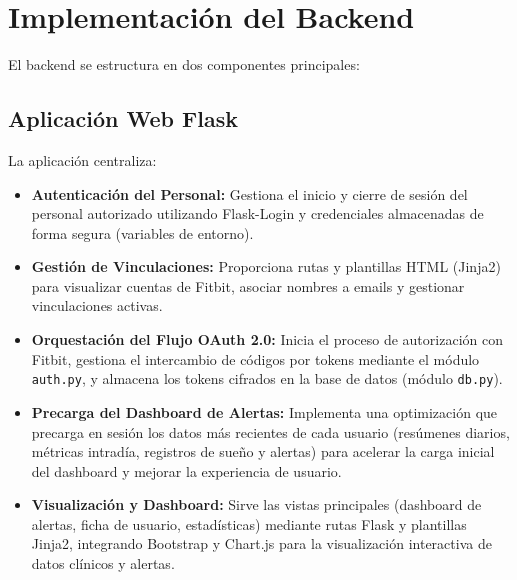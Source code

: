 \section{Implementación del Backend}
\label{sec:impl_backend}

El backend se estructura en dos componentes principales:

\subsection{Aplicación Web Flask}
La aplicación centraliza:
\begin{itemize}
    \item \textbf{Autenticación del Personal:} Gestiona el inicio y cierre de sesión del personal autorizado utilizando Flask-Login y credenciales almacenadas de forma segura (variables de entorno).
    \item \textbf{Gestión de Vinculaciones:} Proporciona rutas y plantillas HTML (Jinja2) para visualizar cuentas de Fitbit, asociar nombres a emails y gestionar vinculaciones activas.
    \item \textbf{Orquestación del Flujo OAuth 2.0:} Inicia el proceso de autorización con Fitbit, gestiona el intercambio de códigos por tokens mediante el módulo \texttt{auth.py}, y almacena los tokens cifrados en la base de datos (módulo \texttt{db.py}).
    \item \textbf{Precarga del Dashboard de Alertas:} Implementa una optimización que precarga en sesión los datos más recientes de cada usuario (resúmenes diarios, métricas intradía, registros de sueño y alertas) para acelerar la carga inicial del dashboard y mejorar la experiencia de usuario.
    \item \textbf{Visualización y Dashboard:} Sirve las vistas principales (dashboard de alertas, ficha de usuario, estadísticas) mediante rutas Flask y plantillas Jinja2, integrando Bootstrap y Chart.js para la visualización interactiva de datos clínicos y alertas.
\end{itemize}

